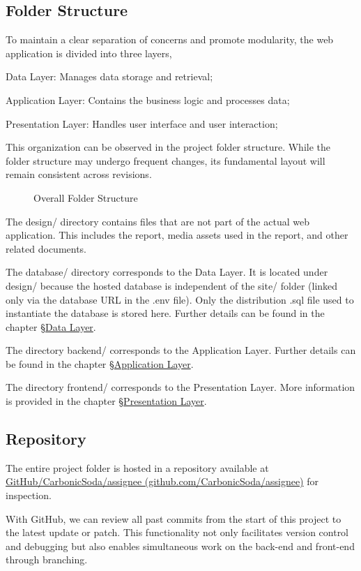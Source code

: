 \documentclass[12pt]{report}
\newcommand{\n}{\par}
\newcommand{\br}{\n\vspace{1 em}\n}
\begin{document}
\subsection{Folder Structure} \label{overview.project-structure.folder-structure}
To maintain a clear separation of concerns and promote modularity, the web application is divided into three layers,\n
Data Layer: Manages data storage and retrieval;\n
Application Layer: Contains the business logic and processes data;\n
Presentation Layer: Handles user interface and user interaction;
\br
This organization can be observed in the project folder structure.
While the folder structure may undergo frequent changes, its fundamental layout will remain consistent across revisions.
\newpage
\begin{figure}[h!]
	\centering
	\begin{minipage}{0.3\linewidth}
	\end{minipage}
	\caption{Overall Folder Structure}
	\label{fig:overview-folder-structure}
\end{figure}
The design/ directory contains files that are not part of the actual web application.
This includes the report, media assets used in the report, and other related documents.
\br
The database/ directory corresponds to the Data Layer.
It is located under design/ because the hosted database is independent of the site/ folder (linked only via the database URL in the .env file).
Only the distribution .sql file used to instantiate the database is stored here.
Further details can be found in the chapter \S \hyperref[data-layer]{Data Layer}.
\br
The directory backend/ corresponds to the Application Layer.
Further details can be found in the chapter \S \hyperref[application-layer]{Application Layer}.
\br
The directory frontend/ corresponds to the Presentation Layer.
More information is provided in the chapter \S \hyperref[presentation-layer]{Presentation Layer}.


\subsection{Repository} \label{overview.project-structure.repository}
The entire project folder is hosted in a repository available at
\href{https://github.com/CarbonicSoda/assignee}{GitHub/Carbonic\-Soda/assignee (github.com/CarbonicSoda/assignee)} for inspection.
\br
With GitHub, we can review all past commits from the start of this project to the latest update or patch.
This functionality not only facilitates version control and debugging but also enables simultaneous work on the back-end and front-end through branching.
\end{document}
